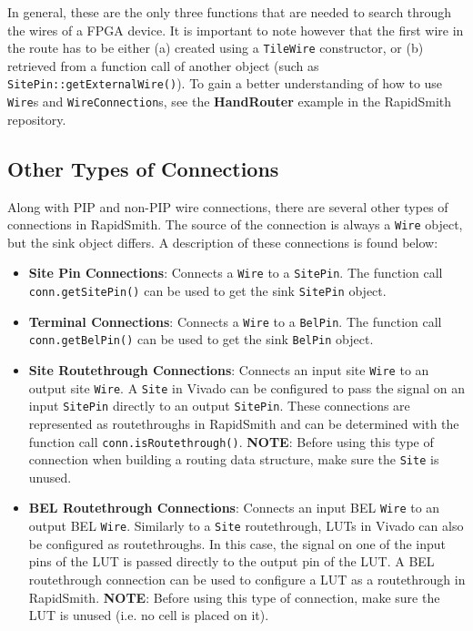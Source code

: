 \documentclass[12pt]{article}
\newcommand{\cls}[1]{{\texttt{#1}}}
\newcommand{\pgm}[1]{{\textbf{#1}}}
\begin{document}
\noindent
In general, these are the only three functions that are needed to
search through the wires of a FPGA device. It is important to note however that
the first wire in the route has to be either (a) created using a \cls{TileWire}
constructor, or (b) retrieved from a function call of another object (such as
\texttt{SitePin::getExternalWire()}). To gain a better understanding of how to
use \cls{Wire}s and \cls{WireConnection}s, see the \pgm{HandRouter} example in
the RapidSmith repository.

\subsection{Other Types of Connections}
Along with PIP and non-PIP wire connections, there are several other types of
connections in RapidSmith. The source of the connection is always a \cls{Wire}
object, but the sink object differs. A description of these connections is found
below:

\begin {itemize}
  
  \item \pgm{Site Pin Connections}: Connects a \cls{Wire} to a \cls{SitePin}.
  The function call \texttt{conn.get\-SitePin()} can be used to get the sink
  \cls {SitePin} object.
  \item \pgm{Terminal Connections}: Connects a \cls{Wire} to a \cls{BelPin}. The
  function call \texttt{conn.get\-BelPin()} can be used to get the sink \cls
  {BelPin} object.
  \item \pgm{Site Routethrough Connections}: Connects an input site \cls{Wire}
  to an output site \cls{Wire}. A \cls{Site} in Vivado can be configured to pass
  the signal on an input \cls{SitePin} directly to an output \cls{SitePin}.
  These connections are represented as routethroughs in RapidSmith and can be
  determined with the function call \texttt{conn.isRoutethrough()}.
  \pgm{NOTE}: Before using this type of connection when building a
  routing data structure, make sure the \cls{Site} is unused.
  \item \pgm{BEL Routethrough Connections}: Connects an input BEL \cls{Wire} to
  an output BEL \cls{Wire}. Similarly to a \cls{Site} routethrough, LUTs in
  Vivado can also be configured as routethroughs. In this case, the signal on one of the
  input pins of the LUT is passed directly to the output pin of the LUT. A BEL
  routethrough connection can be used to configure a LUT as a routethrough in
  RapidSmith.
  \pgm{NOTE}: Before using this type of connection, make sure the LUT is
  unused (i.e. no cell is placed on it).
\end{itemize}
\end{document}
